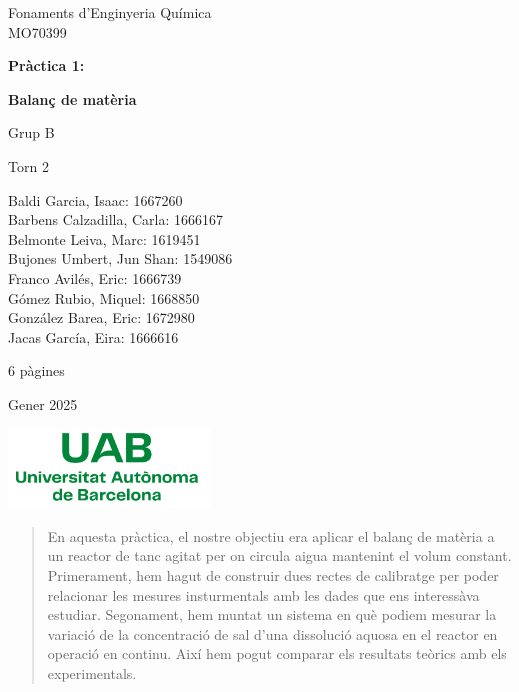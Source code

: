 \documentclass[10pt, twoside]{article}
\begin{document}
\begin{titlepage}
\centering
{\Large Fonaments d'Enginyeria Química \\ MO70399 \par}
\vspace{2cm}
{\Huge \textbf{Pràctica 1:} \par}
\vspace{1cm}
{\Huge \textbf{Balanç de matèria} \par}
\vspace{1cm}
{\Large Grup B \par}
\vspace{0.5cm}
{\Large Torn 2 \par}
\vspace{0.5cm}
{\normalsize Baldi Garcia, Isaac: 1667260 \\ Barbens Calzadilla, Carla: 1666167 \\ Belmonte Leiva, Marc: 1619451 \\ Bujones Umbert, Jun Shan: 1549086 \\ Franco Avilés, Eric: 1666739 \\ Gómez Rubio, Miquel: 1668850 \\ González Barea, Eric: 1672980 \\ Jacas García, Eira: 1666616 \par}
\vspace{1cm}
{\normalsize 6 pàgines \par}
{\Large Gener 2025 \par}
\vspace{2cm}
\includegraphics[width=0.4\textwidth]{Logo_UAB.png}

\end{titlepage}

\renewcommand{\cftsecfont}{}
\renewcommand{\cftsecpagefont}{}
\renewcommand{\cftsecleader}{\cftdotfill{\cftdotsep}}
\renewcommand{\cftdotsep}{0.2}
\setlength{\cftbeforesecskip}{0.5em}
\setlength{\cftbeforesubsecskip}{0.5em}
\tableofcontents

\newpage
{}
\setcounter{page}{1}

\pagestyle{fancy}

\begin{abstract}
En aquesta pràctica, el nostre objectiu era aplicar el balanç de matèria a un reactor de tanc agitat per on circula aigua mantenint el volum constant. Primerament, hem hagut de construir dues rectes de calibratge per poder relacionar les mesures insturmentals amb les dades que ens interessàva estudiar. Segonament, hem muntat un sistema en què podiem mesurar la variació de la concentració de sal d'una dissolució aquosa en el reactor en operació en continu. Així hem pogut comparar els resultats teòrics amb els experimentals.
\end{abstract}
\end{document}
